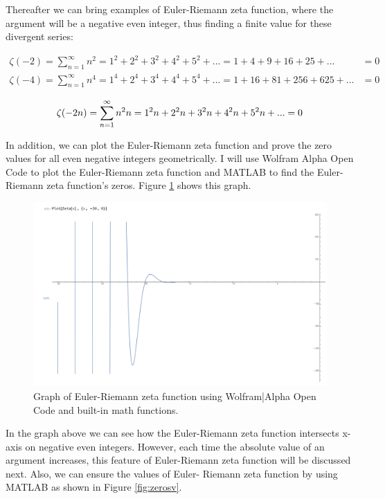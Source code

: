\documentclass{beamer}
\begin{document}
Thereafter we can bring examples of Euler-Riemann zeta function, where the argument will be a
negative even integer, thus finding a finite value for these divergent series:

\begin{align*}
  \zeta(-2)=\sum_{n=1}^{\infty} n^2=1^2+2^2+3^2+4^2+5^2+...=1+4+9+16+25+...&=0\\
  \zeta(-4)=\sum_{n=1}^{\infty} n^4=1^4+2^4+3^4+4^4+5^4+...=1+16+81+256+625+...&=0
\end{align*}

\begin{equation}
\zeta(-2n)=\sum_{n=1}^{\infty} n^2n=1^2n+2^2n+3^2n+4^2n+5^2n+...=0\\  
  \end{equation}

In addition, we can plot the Euler-Riemann zeta function and prove the zero values for all even
negative integers geometrically. I will use Wolfram Alpha Open Code to plot the Euler-Riemann
zeta function and MATLAB to find the Euler-Riemann zeta function's zeros. Figure \ref{fig:zeros} shows this graph.

\begin{figure}[h!]
  \includegraphics[width=\textwidth]{zeros.png}
  \begin{center}
  \caption{Graph of Euler-Riemann zeta function using
Wolfram|Alpha Open Code and built-in math functions.}
    \label{fig:zeros}
  \end{center}
  \end{figure}

In the graph above we can see how the Euler-Riemann zeta function intersects x-axis on negative
even integers. However, each time the absolute value of an argument increases, this feature of
Euler-Riemann zeta function will be discussed next. Also, we can ensure the values of Euler-
Riemann zeta function by using MATLAB as shown in Figure \ref{fig:zerosv}.
\end{document}
